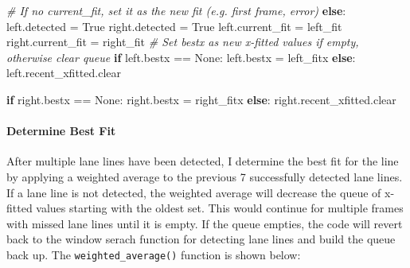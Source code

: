 \documentclass[11pt]{article}
\newenvironment{Shaded}{}{}
\newcommand{\CommentTok}[1]{\textcolor[rgb]{0.38,0.63,0.69}{\textit{{#1}}}}
\newcommand{\NormalTok}[1]{{#1}}
\newcommand{\VariableTok}[1]{\textcolor[rgb]{0.10,0.09,0.49}{{#1}}}
\newcommand{\ControlFlowTok}[1]{\textcolor[rgb]{0.00,0.44,0.13}{\textbf{{#1}}}}
\newcommand{\OperatorTok}[1]{\textcolor[rgb]{0.40,0.40,0.40}{{#1}}}
\begin{document}
\begin{Shaded}
\begin{Highlighting}[]
\CommentTok{# If no current_fit, set it as the new fit (e.g. first frame, error)         }
\ControlFlowTok{else}\NormalTok{:}
\NormalTok{    left.detected }\OperatorTok{=} \VariableTok{True}
\NormalTok{    right.detected }\OperatorTok{=} \VariableTok{True}
\NormalTok{    left.current_fit }\OperatorTok{=}\NormalTok{ left_fit}
\NormalTok{    right.current_fit }\OperatorTok{=}\NormalTok{ right_fit}
    \CommentTok{# Set bestx as new x-fitted values if empty, otherwise clear queue }
    \ControlFlowTok{if}\NormalTok{ left.bestx }\OperatorTok{==} \VariableTok{None}\NormalTok{:}
\NormalTok{        left.bestx }\OperatorTok{=}\NormalTok{ left_fitx}
    \ControlFlowTok{else}\NormalTok{:}
\NormalTok{        left.recent_xfitted.clear}

    \ControlFlowTok{if}\NormalTok{ right.bestx }\OperatorTok{==} \VariableTok{None}\NormalTok{:}
\NormalTok{        right.bestx }\OperatorTok{=}\NormalTok{ right_fitx}
    \ControlFlowTok{else}\NormalTok{:}
\NormalTok{        right.recent_xfitted.clear}
\end{Highlighting}
\end{Shaded}

\hypertarget{determine-best-fit}{%
\paragraph{Determine Best Fit}\label{determine-best-fit}}

After multiple lane lines have been detected, I determine the best fit
for the line by applying a weighted average to the previous 7
successfully detected lane lines. If a lane line is not detected, the
weighted average will decrease the queue of x-fitted values starting
with the oldest set. This would continue for multiple frames with missed
lane lines until it is empty. If the queue empties, the code will revert
back to the window serach function for detecting lane lines and build
the queue back up. The \texttt{weighted\_average()} function is shown
below:
\end{document}
